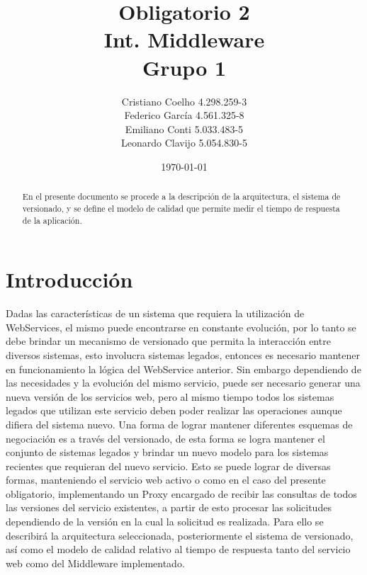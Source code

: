 \documentclass[12pt]{article}
\title{Obligatorio 2 \\ Int. Middleware \\ Grupo 1 }
\author{
  Cristiano Coelho 4.298.259-3\\
  Federico García 4.561.325-8\\
  Emiliano Conti 5.033.483-5\\
  Leonardo Clavijo 5.054.830-5
}
\date{\today}
\begin{document}
\maketitle

\begin{abstract}
En el presente documento se procede a la descripción de la arquitectura, el sistema de versionado,  y se define el modelo de calidad que permite medir el tiempo de respuesta de la aplicación.
\end{abstract}

\newpage
\tableofcontents
\newpage

\section{Introducción}
Dadas las características de un sistema que requiera la utilización de WebServices, el mismo puede encontrarse en constante evolución, por lo tanto se debe brindar un mecanismo de versionado que permita la interacción entre diversos sistemas, esto involucra sistemas legados, entonces es necesario mantener en funcionamiento la lógica del WebService anterior. Sin embargo dependiendo de las necesidades y la evolución del mismo servicio, puede ser necesario generar una nueva versión de los servicios web, pero al mismo tiempo todos los sistemas legados que utilizan este servicio deben poder realizar las operaciones aunque difiera del sistema nuevo.
Una forma de lograr mantener diferentes esquemas de negociación es a través del versionado, de esta forma se logra mantener el conjunto de sistemas legados y brindar un nuevo modelo para los sistemas recientes que requieran del nuevo servicio. Esto se puede lograr de diversas formas, manteniendo el servicio web activo o como en el caso del presente obligatorio, implementando un Proxy encargado de recibir las consultas de todos las versiones del servicio existentes, a partir de esto procesar las solicitudes dependiendo de la versión en la cual la solicitud es realizada. Para ello se describirá la arquitectura seleccionada, posteriormente el sistema de versionado, así como el modelo de calidad relativo al tiempo de respuesta tanto del servicio web como del Middleware implementado.
\end{document}
